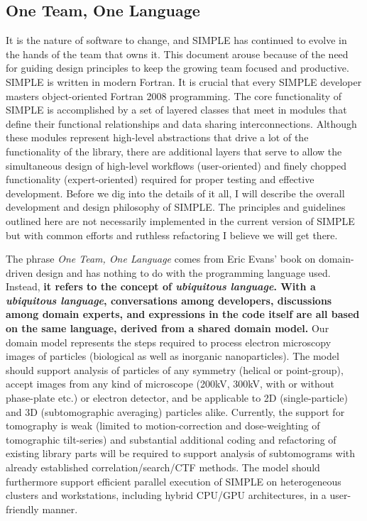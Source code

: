 \documentclass[a4paper,11pt]{article}
\begin{document}
\subsection{One Team, One Language}
It is the nature of software to change, and SIMPLE has continued to evolve in the hands of the team that owns it. This document arouse because of the need for guiding design principles to keep the growing team focused and productive. SIMPLE is written in modern Fortran. It is crucial that every SIMPLE developer masters object-oriented Fortran 2008 programming. The core functionality of SIMPLE is accomplished by a set of layered classes that meet in modules that define their functional relationships and data sharing interconnections. Although these modules represent high-level abstractions that drive a lot of the functionality of the library, there are additional layers that serve to allow the simultaneous design of high-level workflows (user-oriented) and finely chopped functionality (expert-oriented) required for proper testing and effective development. Before we dig into the details of it all, I will describe the overall development and design philosophy of SIMPLE. The principles and guidelines outlined here are not necessarily implemented in the current version of SIMPLE but with common efforts and ruthless refactoring I believe we will get there.

The phrase \textit{One Team, One Language} comes from Eric Evans' book on domain-driven design and has nothing to do with the programming language used. Instead, \textbf{it refers to the concept of \textit{ubiquitous language}. With a \textit{ubiquitous language}, conversations among developers, discussions among domain experts, and expressions in the code itself are all based on the same language, derived from a shared domain model.} Our domain model represents the steps required to process electron microscopy images of particles (biological as well as inorganic nanoparticles). The model should support analysis of particles of any symmetry (helical or point-group), accept images from any kind of microscope (200kV, 300kV, with or without phase-plate etc.) or electron detector, and be applicable to 2D (single-particle) and 3D (subtomographic averaging) particles alike. Currently, the support for tomography is weak (limited to motion-correction and dose-weighting of tomographic tilt-series) and substantial additional coding and refactoring of existing library parts will be required to support analysis of subtomograms with already established correlation/search/CTF methods. The model should furthermore support efficient parallel execution of SIMPLE on heterogeneous clusters and workstations, including hybrid CPU/GPU architectures, in a user-friendly manner.
\end{document}
